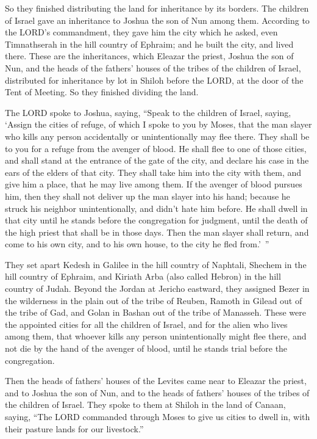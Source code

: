 \myverse{}So they finished distributing the land for inheritance by its
borders. The children of Israel gave an inheritance to Joshua the son of Nun among them.
\myverse{}According to the LORD’s commandment, they gave him the city which he asked,
even Timnathserah in the hill country of Ephraim; and he built the city, and lived there.
\myverse{}These are the inheritances, which Eleazar the priest, Joshua the son of Nun,
and the heads of the fathers’ houses of the tribes of the children of Israel, distributed for inheritance
by lot in Shiloh before the LORD, at the door of the Tent of Meeting. So they finished dividing the land.


\mychapter{} \myverse*{}The LORD spoke to Joshua, saying,
\myverse{}“Speak to the children of Israel, saying, ‘Assign the cities of refuge, of
which I spoke to you by Moses,
\myverse{}that the man slayer who kills any person accidentally or unintentionally may
flee there. They shall be to you for a refuge from the avenger of blood.
\myverse{}He shall flee to one of those cities, and shall stand at the entrance of the
gate of the city, and declare his case in the ears of the elders of that city. They shall take him into
the city with them, and give him a place, that he may live among them.
\myverse{}If the avenger of blood pursues him, then they shall not deliver up the man
slayer into his hand; because he struck his neighbor unintentionally, and didn’t hate him before.
\myverse{}He shall dwell in that city until he stands before the congregation for judgment,
until the death of the high priest that shall be in those days. Then the man slayer shall return, and
come to his own city, and to his own house, to the city he fled from.’ ”

\myverse{}They set apart Kedesh in Galilee in the hill country of Naphtali,
Shechem in the hill country of Ephraim, and Kiriath Arba (also called Hebron) in the hill country of Judah.
\myverse{}Beyond the Jordan at Jericho eastward, they assigned Bezer in the wilderness
in the plain out of the tribe of Reuben, Ramoth in Gilead out of the tribe of Gad, and Golan in Bashan
out of the tribe of Manasseh.
\myverse{}These were the appointed cities for all the children of Israel, and for the
alien who lives among them, that whoever kills any person unintentionally might flee there, and not die
by the hand of the avenger of blood, until he stands trial before the congregation.


\mychapter{} \myverse*{}Then the heads of fathers’ houses of the Levites came near to
Eleazar the priest, and to Joshua the son of Nun, and to the heads of fathers’ houses of the tribes of
the children of Israel.
\myverse{}They spoke to them at Shiloh in the land of Canaan, saying, “The LORD commanded
through Moses to give us cities to dwell in, with their pasture lands for our livestock.”

